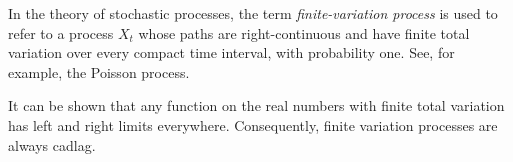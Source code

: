 \documentclass[12pt]{article}
\begin{document}
In the theory of stochastic processes, the term \emph{finite-variation process} is used to refer to a process $X_t$ whose paths are right-continuous and have finite total variation over every compact time interval, with probability one. See, for example, the Poisson process.

It can be shown that any function on the real numbers with finite total variation has left and right limits everywhere. Consequently, finite variation processes are always cadlag.
\end{document}
